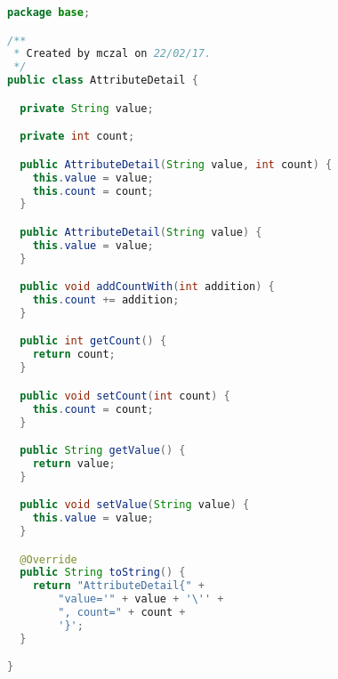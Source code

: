 \begin{lstlisting}[language=Java,basicstyle=\tiny,caption=AttributeDetail.java]
package base;

/**
 * Created by mczal on 22/02/17.
 */
public class AttributeDetail {

  private String value;

  private int count;

  public AttributeDetail(String value, int count) {
    this.value = value;
    this.count = count;
  }

  public AttributeDetail(String value) {
    this.value = value;
  }

  public void addCountWith(int addition) {
    this.count += addition;
  }

  public int getCount() {
    return count;
  }

  public void setCount(int count) {
    this.count = count;
  }

  public String getValue() {
    return value;
  }

  public void setValue(String value) {
    this.value = value;
  }

  @Override
  public String toString() {
    return "AttributeDetail{" +
        "value='" + value + '\'' +
        ", count=" + count +
        '}';
  }

}
\end{lstlisting}


